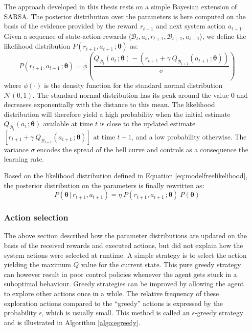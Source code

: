 The approach developed in this thesis rests on a simple Bayesian extension of SARSA.  The posterior distribution over the parameters is here computed on the basis of the evidence provided by the reward $r_{t+1}$ and next system action $a_{t+1}$.  Given a sequence of state-action-rewards $\langle \mathcal{B}_t, a_t, r_{t+1}, \mathcal{B}_{t+1}, a_{t+1} \rangle$, we define the likelihood distribution $P(r_{t+1}, a_{t+1} \,; \boldsymbol\theta)$ as:
\begin{equation}
P(r_{t+1}, a_{t+1} \,; \boldsymbol\theta) = \phi \left(\frac{Q_{\mathcal{B}_t}\left(a_t \,; \boldsymbol\theta\right) - \left(r_{t+1} + \gamma \ Q_{\mathcal{B}_{t+1}} \left(a_{t+1} \,; \boldsymbol\theta\right) \right)}{\sigma} \right) \label{eq:modelfreelikelihood}
\end{equation}
where $\phi(\cdot)$ is the density function for the standard normal distribution $\mathcal{N}(0, 1)$. The standard normal distribution has its peak around the value 0 and decreases exponentially with the distance to this mean. The likelihood distribution will therefore yield a high probability when the initial estimate 
$Q_{\mathcal{B}_t}(a_t \,; \boldsymbol\theta)$ available at time $t$ is close to the updated estimate $\left[r_{t+1} + \gamma \ Q_{\mathcal{B}_{t+1}} (a_{t+1} \,; \boldsymbol\theta) \right]$ at time $t+1$, and a low probability otherwise. The variance $\sigma$ encodes the spread of the bell curve and controls as a consequence the learning rate.

Based on the likelihood distribution defined in Equation \eqref{eq:modelfreelikelihood}, the posterior distribution on the parameters is finally rewritten as: 
\begin{equation}
P(\boldsymbol\theta \, | \, r_{t+1}, a_{t+1}) = \eta \ P(r_{t+1}, a_{t+1} \,; \boldsymbol\theta)  \ P(\boldsymbol\theta)  \label{eq:posteriormodelfree}
\end{equation}


\subsubsection*{Action selection}

The above section described how the parameter distributions are updated on the basis of the received rewards and executed actions, but did not explain how the system actions were selected at runtime.  A simple strategy is to select the action yielding the maximum $Q$ value for the current state.  This pure greedy strategy can however result in poor control policies whenever the agent gets stuck in a suboptimal behaviour.  Greedy strategies can be improved by allowing the agent to explore other actions once in a while. The relative frequency of these exploration actions compared to the  ``greedy'' actions is expressed by the probability $\epsilon$, which is usually small. This method is called an $\epsilon$-greedy strategy and is illustrated in Algorithm \ref{algo:egreedy}.

